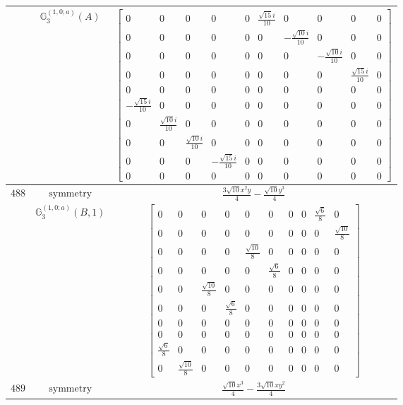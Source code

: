 \documentclass[fleqn,8pt,landscape]{jsarticle}
\begin{document}
\begin{longtable}{ccc}
$  $ & $ \mathbb{G}_{3}^{(1,0;a)}(A) $ & $ \begin{bmatrix} 0 & 0 & 0 & 0 & 0 & \frac{\sqrt{15} i}{10} & 0 & 0 & 0 & 0 \\ 0 & 0 & 0 & 0 & 0 & 0 & - \frac{\sqrt{10} i}{10} & 0 & 0 & 0 \\ 0 & 0 & 0 & 0 & 0 & 0 & 0 & - \frac{\sqrt{10} i}{10} & 0 & 0 \\ 0 & 0 & 0 & 0 & 0 & 0 & 0 & 0 & \frac{\sqrt{15} i}{10} & 0 \\ 0 & 0 & 0 & 0 & 0 & 0 & 0 & 0 & 0 & 0 \\ - \frac{\sqrt{15} i}{10} & 0 & 0 & 0 & 0 & 0 & 0 & 0 & 0 & 0 \\ 0 & \frac{\sqrt{10} i}{10} & 0 & 0 & 0 & 0 & 0 & 0 & 0 & 0 \\ 0 & 0 & \frac{\sqrt{10} i}{10} & 0 & 0 & 0 & 0 & 0 & 0 & 0 \\ 0 & 0 & 0 & - \frac{\sqrt{15} i}{10} & 0 & 0 & 0 & 0 & 0 & 0 \\ 0 & 0 & 0 & 0 & 0 & 0 & 0 & 0 & 0 & 0 \end{bmatrix} $ \\ \hline
$ 488 $ & $ \text{symmetry} $ & $ \frac{3 \sqrt{10} x^{2} y}{4} - \frac{\sqrt{10} y^{3}}{4} $ \\
$  $ & $ \mathbb{G}_{3}^{(1,0;a)}(B,1) $ & $ \begin{bmatrix} 0 & 0 & 0 & 0 & 0 & 0 & 0 & 0 & \frac{\sqrt{6}}{8} & 0 \\ 0 & 0 & 0 & 0 & 0 & 0 & 0 & 0 & 0 & \frac{\sqrt{10}}{8} \\ 0 & 0 & 0 & 0 & \frac{\sqrt{10}}{8} & 0 & 0 & 0 & 0 & 0 \\ 0 & 0 & 0 & 0 & 0 & \frac{\sqrt{6}}{8} & 0 & 0 & 0 & 0 \\ 0 & 0 & \frac{\sqrt{10}}{8} & 0 & 0 & 0 & 0 & 0 & 0 & 0 \\ 0 & 0 & 0 & \frac{\sqrt{6}}{8} & 0 & 0 & 0 & 0 & 0 & 0 \\ 0 & 0 & 0 & 0 & 0 & 0 & 0 & 0 & 0 & 0 \\ 0 & 0 & 0 & 0 & 0 & 0 & 0 & 0 & 0 & 0 \\ \frac{\sqrt{6}}{8} & 0 & 0 & 0 & 0 & 0 & 0 & 0 & 0 & 0 \\ 0 & \frac{\sqrt{10}}{8} & 0 & 0 & 0 & 0 & 0 & 0 & 0 & 0 \end{bmatrix} $ \\ \hline
$ 489 $ & $ \text{symmetry} $ & $ \frac{\sqrt{10} x^{3}}{4} - \frac{3 \sqrt{10} x y^{2}}{4} $ \\

\end{longtable}
\end{document}
